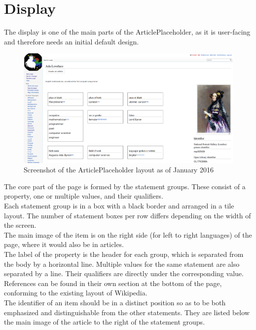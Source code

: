 \section{Display}
	The display is one of the main parts of the ArticlePlaceholder, as it is user-facing and therefore needs an initial default design. \\
	\begin{figure}[H]
		\centering
		\includegraphics[width=\textwidth]{diagrams/Screenshot-ArticlePlaceholder.png}
		\caption{Screenshot of the ArticlePlaceholder layout as of January 2016}
		\label{screenshot}
	\end{figure}
	The core part of the page is formed by the statement groups. These consist of a property, one or multiple values, and their qualifiers. \\
	Each statement group is in a box with a black border and arranged in a tile layout. The number of statement boxes per row differs depending on the width of the screen. \\
	The main image of the item is on the right side (for left to right languages) of the page, where it would also be in articles.\\
	The label of the property is the header for each group, which is separated from the body by a horizontal line. Multiple values for the same statement are also separated by a line. Their qualifiers are directly under the corresponding value. \\
	References can be found in their own section at the bottom of the page, conforming to the existing layout of Wikipedia. \\
	The identifier of an item should be in a distinct position so as to be both emphasized and distinguishable from the other statements. They are listed below the main image of the article to the right of the statement groups.
	
	
	
	
	